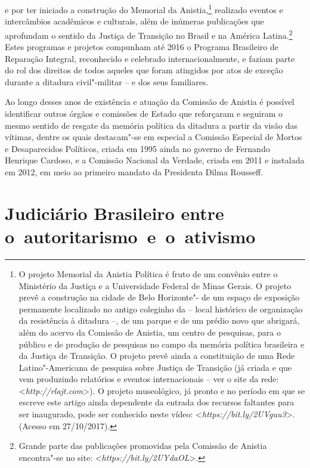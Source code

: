   e por ter iniciado a construção do Memorial
da Anistia,\footnote{O projeto Memorial da Anistia Política é fruto de um
  convênio entre o Ministério da Justiça e a Universidade Federal de
  Minas Gerais. O projeto prevê a construção na cidade de Belo
  Horizonte"- de um espaço de exposição permanente localizado no antigo
  coleginho da  -- local histórico de organização da resistência à
  ditadura --, de um parque e de um prédio novo que abrigará, além do acervo da
  Comissão de Anistia, um centro de pesquisas, para o público e de
  produção de pesquisas no campo da memória política brasileira e da
  Justiça de Transição. O projeto prevê ainda a constituição de uma Rede
  Latino"-Americana de pesquisa sobre Justiça de Transição (já criada e
  que vem produzindo relatórios e eventos internacionais -- ver o site da
  rede: \textless{}\emph{http://rlajt.com}\textgreater{}).
  O projeto museológico, já pronto e no
  período em que se escreve este artigo ainda dependente da entrada dos
  recursos faltantes para ser inaugurado, pode ser conhecido neste
  vídeo: \textless{}\emph{https://bit.ly/2UVguu3}\textgreater{}. (Acesso em
  27/10/2017).} realizado eventos e intercâmbios acadêmicos e
culturais, além de inúmeras publicações que aprofundam o sentido da
Justiça de Transição no Brasil e na América Latina.\footnote{Grande parte
  das publicações promovidas pela Comissão de Anistia encontra"-se no
  site: \textless{}\emph{https://bit.ly/2UYdaOL}\textgreater{}.}
  Estes programas e projetos compunham até 2016 o Programa
Brasileiro de Reparação Integral, reconhecido e celebrado
internacionalmente, e faziam parte do rol dos direitos de todos aqueles
que foram atingidos por atos de exceção durante a ditadura civil"-militar --
e dos seus familiares.

Ao longo desses anos de existência e atuação da Comissão de Anistia é
possível identificar outros órgãos e comissões de Estado que reforçaram
e seguiram o mesmo sentido de resgate da memória política da ditadura a
partir da visão das vítimas, dentre os quais destacam"-se em especial a
Comissão Especial de Mortos e Desaparecidos Políticos, criada em 1995
ainda no governo de Fernando Henrique Cardoso, e a Comissão Nacional da
Verdade, criada em 2011 e instalada em 2012, em meio ao primeiro mandato
da Presidenta Dilma Rousseff.

\section{Judiciário Brasileiro entre o~autoritarismo~e~o~ativismo}

